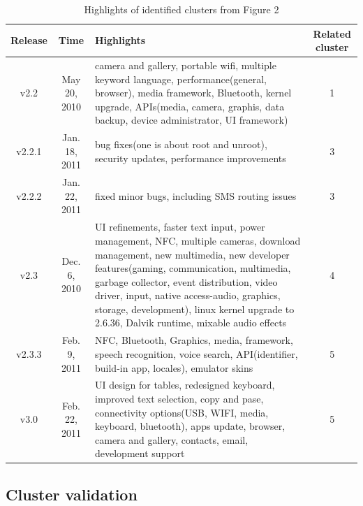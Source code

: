 \documentclass[conference]{IEEEtran}
\begin{document}
\begin{table}[!t]
\caption{Highlights of identified clusters from Figure 2}
\label{release}
\centering
\begin{tabular}{|c|c|p{9.5cm}|c|}
\hline
Release & Time & Highlights & Related cluster\\
\hline
v2.2 & May 20, 2010 & camera and gallery, portable wifi, multiple keyword language, performance(general, browser), media framework, Bluetooth, kernel upgrade, APIs(media, camera, graphis, data backup, device administrator, UI framework) & 1 \\
\hline
v2.2.1 & Jan. 18, 2011 & bug fixes(one is about root and unroot), security updates, performance improvements & 3\\
\hline
v2.2.2 & Jan. 22, 2011 & fixed minor bugs, including SMS routing issues & 3\\
\hline
v2.3 & Dec. 6, 2010 & UI refinements, faster text input, power management, NFC, multiple cameras, download management, new multimedia, new developer features(gaming, communication, multimedia, garbage collector, event distribution, video driver, input, native access-audio, graphics, storage, development), linux kernel upgrade to 2.6.36, Dalvik runtime, mixable audio effects & 4\\
\hline
v2.3.3 & Feb. 9, 2011 & NFC, Bluetooth, Graphics, media, framework, speech recognition, voice search, API(identifier, build-in app, locales), emulator skins & 5 \\
\hline
v3.0 & Feb. 22, 2011 & UI design for tables, redesigned keyboard, improved text selection, copy and pase, connectivity options(USB, WIFI, media, keyboard, bluetooth), apps update, browser, camera and gallery, contacts, email, development support & 5 \\
\hline
\end{tabular}
\end{table}



\subsection{Cluster validation}
\end{document}
